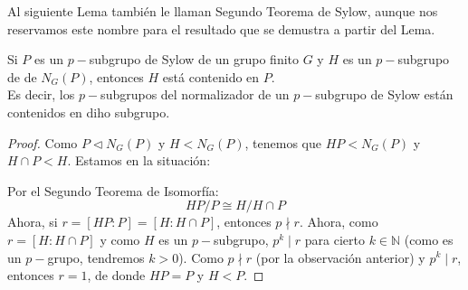 Al siguiente Lema también le llaman Segundo Teorema de Sylow, aunque nos reservamos este nombre para el resultado que se demustra a partir del Lema.
\begin{lema}
    Si $P$ es un $p-$subgrupo de Sylow de un grupo finito $G$ y $H$ es un $p-$subgrupo de de $N_G(P)$, entonces $H$ está contenido en $P$.\\

    \noindent
    Es decir, los $p-$subgrupos del normalizador de un $p-$subgrupo de Sylow están contenidos en diho subgrupo. 
    \begin{proof}
        Como $P\lhd N_G(P)$ y $H<N_G(P)$, tenemos que $HP < N_G(P)$ y $H\cap P < H$. Estamos en la situación:
        \begin{figure}[H]
            \centering
        \end{figure}
        \noindent
        Por el Segundo Teorema de Isomorfía:
        \begin{equation*}
            HP/P \cong H/H\cap P
        \end{equation*}
        Ahora, si $r = [HP:P] = [H:H\cap P]$, entonces $p\nmid r$. Ahora, como $r = [H:H\cap P]$ y como $H$ es un $p-$subgrupo, $p^k \mid r$ para cierto $k\in \mathbb{N}$ (como es un $p-$grupo, tendremos $k>0$). Como $p\nmid r$ (por la observación anterior) y $p^k \mid r$, entonces $r = 1$, de donde $HP = P$ y $H<P$.
    \end{proof}
\end{lema}

